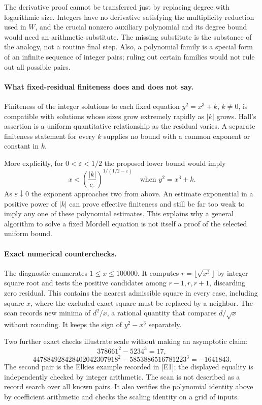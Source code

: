 \documentclass[11pt]{article}
\begin{document}
The derivative proof cannot be transferred just by replacing degree with logarithmic size. Integers have no derivative satisfying the multiplicity reduction used in $W$, and the crucial nonzero auxiliary polynomial and its degree bound would need an arithmetic substitute. The missing substitute is the substance of the analogy, not a routine final step. Also, a polynomial family is a special form of an infinite sequence of integer pairs; ruling out certain families would not rule out all possible pairs.

\paragraph{What fixed-residual finiteness does and does not say.}
Finiteness of the integer solutions to each fixed equation $y^2=x^3+k$, $k\ne0$, is compatible with solutions whose sizes grow extremely rapidly as $|k|$ grows. Hall's assertion is a uniform quantitative relationship as the residual varies. A separate finiteness statement for every $k$ supplies no bound with a common exponent or constant in $k$.

More explicitly, for $0<\varepsilon<1/2$ the proposed lower bound would imply
\[
                 x<\left(\frac{|k|}{c_\varepsilon}\right)^{1/(1/2-\varepsilon)}
                    \quad\text{when }y^2=x^3+k.
\]
As $\varepsilon\downarrow0$ the exponent approaches two from above. An estimate exponential in a positive power of $|k|$ can prove effective finiteness and still be far too weak to imply any one of these polynomial estimates. This explains why a general algorithm to solve a fixed Mordell equation is not itself a proof of the selected uniform bound.

\paragraph{Exact numerical counterchecks.}
The diagnostic enumerates $1\leq x\leq100000$. It computes $r=\lfloor\sqrt{x^3}\rfloor$ by integer square root and tests the positive candidates among $r-1,r,r+1$, discarding zero residual. This contains the nearest admissible square in every case, including square $x$, where the excluded exact square must be replaced by a neighbor. The scan records new minima of $d^2/x$, a rational quantity that compares $d/\sqrt x$ without rounding. It keeps the sign of $y^2-x^3$ separately.

Two further exact checks illustrate scale without making an asymptotic claim:
\[
 378661^2-5234^3=17,
\]
\[
 447884928428402042307918^2
   -5853886516781223^3=-1641843.
\]
The second pair is the Elkies example recorded in [E1]; the displayed equality is independently checked by integer arithmetic. The scan is not described as a record search over all known pairs. It also verifies the polynomial identity above by coefficient arithmetic and checks the scaling identity on a grid of inputs.
\end{document}
